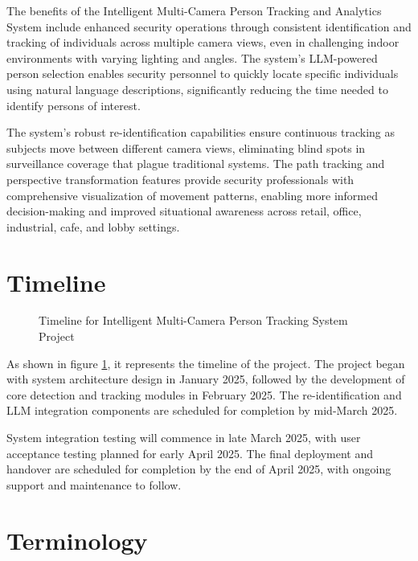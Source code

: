 The benefits of the Intelligent Multi-Camera Person Tracking and Analytics System include enhanced security operations through consistent identification and tracking of individuals across multiple camera views, even in challenging indoor environments with varying lighting and angles. The system's LLM-powered person selection enables security personnel to quickly locate specific individuals using natural language descriptions, significantly reducing the time needed to identify persons of interest.

The system's robust re-identification capabilities ensure continuous tracking as subjects move between different camera views, eliminating blind spots in surveillance coverage that plague traditional systems. The path tracking and perspective transformation features provide security professionals with comprehensive visualization of movement patterns, enabling more informed decision-making and improved situational awareness across retail, office, industrial, cafe, and lobby settings.

\section{Timeline}
\label{section:timeline}

\begin{figure}[h!]
    \centering
    \caption{Timeline for Intelligent Multi-Camera Person Tracking System Project}
    \label{fig:timeline}
\end{figure}

As shown in figure \ref{fig:timeline}, it represents the timeline of the project.
The project began with system architecture design in January 2025, followed by the development of core detection
and tracking modules in February 2025. The re-identification and LLM integration components are scheduled for
completion by mid-March 2025.

System integration testing will commence in late March 2025, with user acceptance testing planned for early April 2025.
The final deployment and handover are scheduled for completion by the end of April 2025, with ongoing support
and maintenance to follow.

\section{Terminology}
\label{section:terminology}


